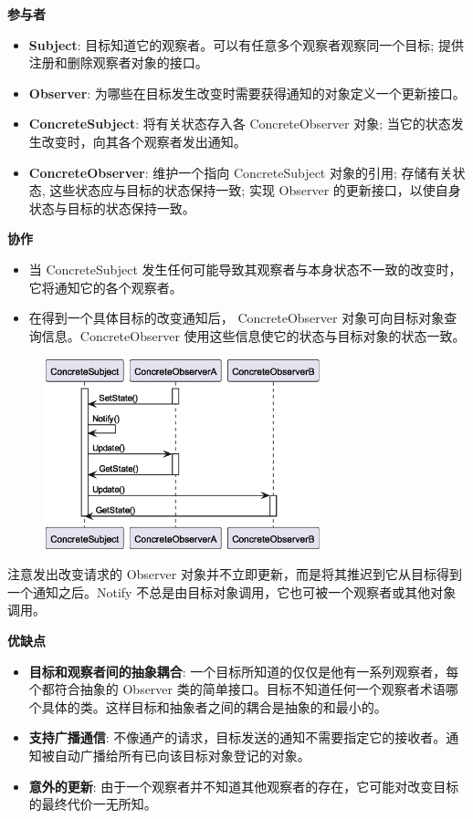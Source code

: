 \noindent\textbf{参与者}

\begin{itemize}
    \item \textbf{Subject}: 目标知道它的观察者。可以有任意多个观察者观察同一个目标; 提供注册和删除观察者对象的接口。
    \item \textbf{Observer}: 为哪些在目标发生改变时需要获得通知的对象定义一个更新接口。
    \item \textbf{ConcreteSubject}: 将有关状态存入各 ConcreteObserver 对象; 当它的状态发生改变时，向其各个观察者发出通知。
    \item \textbf{ConcreteObserver}: 维护一个指向 ConcreteSubject 对象的引用; 存储有关状态, 这些状态应与目标的状态保持一致; 实现 Observer 的更新接口，以使自身状态与目标的状态保持一致。
\end{itemize}

\noindent\textbf{协作}

\begin{itemize}
    \item 当 ConcreteSubject 发生任何可能导致其观察者与本身状态不一致的改变时，它将通知它的各个观察者。
    \item 在得到一个具体目标的改变通知后， ConcreteObserver 对象可向目标对象查询信息。ConcreteObserver 使用这些信息使它的状态与目标对象的状态一致。
\end{itemize}

\begin{figure}[H] 
    \centering 
    \includegraphics[width=8cm]{figures/Observer.eps} 
\end{figure}

注意发出改变请求的 Observer 对象并不立即更新，而是将其推迟到它从目标得到一个通知之后。Notify 不总是由目标对象调用，它也可被一个观察者或其他对象调用。

\noindent\textbf{优缺点}

\begin{itemize}
    \item \textbf{目标和观察者间的抽象耦合}: 一个目标所知道的仅仅是他有一系列观察者，每个都符合抽象的 Observer 类的简单接口。目标不知道任何一个观察者术语哪个具体的类。这样目标和抽象者之间的耦合是抽象的和最小的。
    \item \textbf{支持广播通信}: 不像通产的请求，目标发送的通知不需要指定它的接收者。通知被自动广播给所有已向该目标对象登记的对象。
    \item \textbf{意外的更新}: 由于一个观察者并不知道其他观察者的存在，它可能对改变目标的最终代价一无所知。
\end{itemize}

